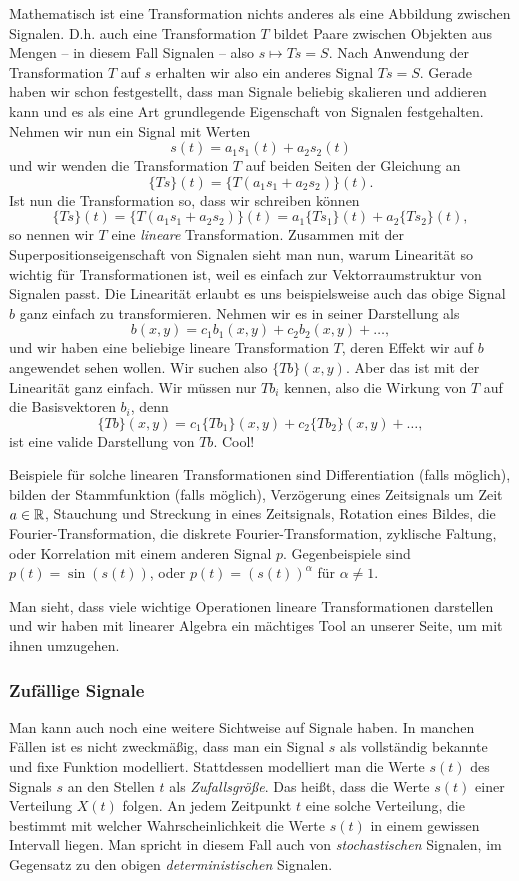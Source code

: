 Mathematisch ist eine Transformation nichts anderes als eine Abbildung zwischen Signalen.
D.h. auch eine Transformation $T$ bildet Paare zwischen Objekten aus Mengen -- in diesem Fall Signalen -- also $s \mapsto Ts = S$.
Nach Anwendung der Transformation $T$ auf $s$ erhalten wir also ein anderes Signal $Ts = S$.
Gerade haben wir schon festgestellt, dass man Signale beliebig skalieren und addieren kann und es als eine Art grundlegende Eigenschaft von Signalen festgehalten.
Nehmen wir nun ein Signal mit Werten
\[
    s(t) = a_1 s_1(t) + a_2 s_2(t)
\] 
und wir wenden die Transformation $T$ auf beiden Seiten der Gleichung an
\[
    \{Ts\}(t) = \{T (a_1 s_1 + a_2 s_2)\}(t).
\]
Ist nun die Transformation so, dass wir schreiben k\"onnen
\[
    \{Ts\}(t) = \{T (a_1 s_1 + a_2 s_2)\}(t) = a_1 \{Ts_1\}(t) + a_2 \{Ts_2\}(t),
\]
so nennen wir $T$ eine \emph{lineare} Transformation.
Zusammen mit der Superpositionseigenschaft von Signalen sieht man nun, warum
Linearit\"at so wichtig f\"ur Transformationen ist, weil es einfach zur Vektorraumstruktur von Signalen passt.
Die Linearit\"at erlaubt es uns beispielsweise auch das obige Signal $b$ ganz einfach zu transformieren.
Nehmen wir es in seiner Darstellung als
\[
    b(x,y) = c_1 b_1(x,y) + c_2 b_2(x,y) + \dots,
\]
und wir haben eine beliebige lineare Transformation $T$, deren Effekt wir auf $b$ angewendet sehen wollen. 
Wir suchen also $\{Tb\}(x,y)$.
Aber das ist mit der Linearit\"at ganz einfach. Wir m\"ussen nur $Tb_i$ kennen, also die Wirkung von $T$ auf die Basisvektoren $b_i$, denn
\[
    \{Tb\}(x,y) = c_1 \{Tb_1\}(x,y) + c_2 \{Tb_2\}(x,y) + \dots,
\]
ist eine valide Darstellung von $Tb$.
Cool!

Beispiele f\"ur solche linearen Transformationen sind Differentiation (falls m\"oglich), bilden der Stammfunktion (falls m\"oglich), Verz\"ogerung eines Zeitsignals um Zeit $a \in \mathbb{R}$, Stauchung und Streckung in eines Zeitsignals, Rotation eines Bildes, die Fourier-Transformation, die diskrete Fourier-Transformation, zyklische Faltung, oder Korrelation mit einem anderen Signal $p$.
Gegenbeispiele sind $p(t) = \sin(s(t))$, oder $p(t) = (s(t))^\alpha$ f\"ur $\alpha \neq 1$.

Man sieht, dass viele wichtige Operationen lineare Transformationen darstellen und wir haben mit linearer Algebra ein m\"achtiges Tool an unserer Seite, um mit ihnen umzugehen.
%
%
\subsubsection{Zuf\"allige Signale}
%
Man kann auch noch eine weitere Sichtweise auf Signale haben. In manchen F\"allen ist es nicht zweckm\"a\ss{}ig, dass man ein Signal $s$ als vollst\"andig bekannte und fixe Funktion modelliert.
Stattdessen modelliert man die Werte $s(t)$ des Signals $s$ an den Stellen $t$ als \emph{Zufallsgr\"o\ss{}e}.
Das hei\ss{}t, dass die Werte $s(t)$ einer Verteilung $X(t)$ folgen. 
An jedem Zeitpunkt $t$  eine solche Verteilung, die bestimmt mit welcher Wahrscheinlichkeit die Werte $s(t)$ in einem gewissen Intervall liegen.
Man spricht in diesem Fall auch von \emph{stochastischen} Signalen, im Gegensatz zu den obigen \emph{deterministischen} Signalen.

